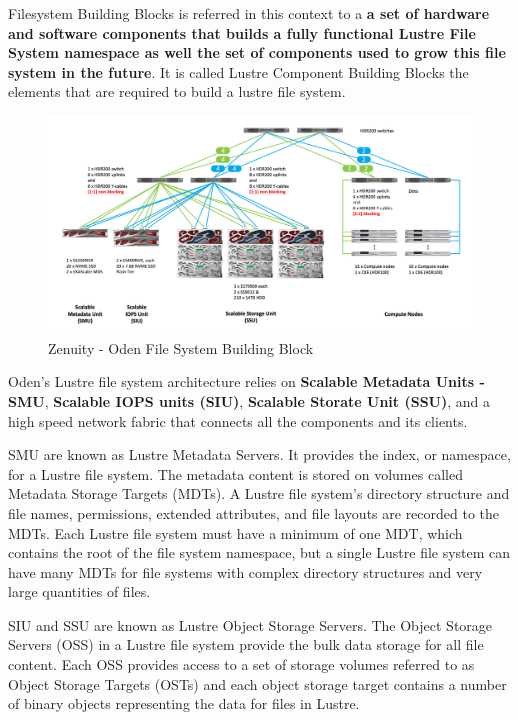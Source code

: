 \documentclass{article}
\begin{document}
Filesystem Building Blocks is referred in this context to a \textbf{a set of hardware and software components that builds a fully functional Lustre File System namespace as well the set of components used to grow this file system in the future}. It is called Lustre Component Building Blocks the elements that are required to build a lustre file system.
\begin{figure}[h]
    \centering
    \includegraphics[scale=0.30]{Zenuity-Building-block.png}
    \caption{Zenuity - Oden File System Building Block}
    \label{fig:zenuity-lustre-block}
\end{figure}

Oden's Lustre file system architecture relies on \textbf{Scalable Metadata Units - SMU}, \textbf{Scalable IOPS units (SIU)}, \textbf{Scalable Storate Unit (SSU)}, and a high speed network fabric that connects all the components and its clients.

SMU are known as Lustre Metadata Servers. It provides the index, or namespace, for a Lustre file system. The metadata content is stored on volumes called Metadata Storage Targets (MDTs). A Lustre file system’s directory structure and file names, permissions, extended attributes, and file layouts are recorded to the MDTs. Each Lustre file system must have a minimum of one MDT, which contains the root of the file system namespace, but a single Lustre file system can have many MDTs for file systems with complex directory structures and very large quantities of files.

SIU and SSU are known as Lustre Object Storage Servers. The Object Storage Servers (OSS) in a Lustre file system provide the bulk data storage for all file content. Each OSS provides access to a set of storage volumes referred to as Object Storage Targets (OSTs) and each object storage target contains a number of binary objects representing the data for files in Lustre.
\end{document}
